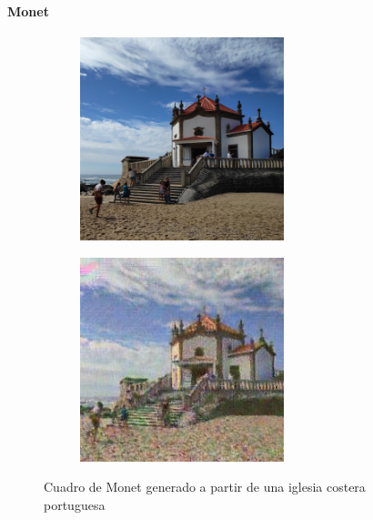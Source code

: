 \documentclass[[../main.tex]{subfiles}
\begin{document}
        \newpage
    
    \paragraph{Monet}
    
    \begin{figure}[!htb]
            \begin{subfigure}[b]{0.49\textwidth}
            \includegraphics[width=0.65\textwidth]{imagenes/imagen2cuadro/propias/monet/IMG_20190901_131403.jpg}
            \end{subfigure}
        \hfill
            \begin{subfigure}[b]{0.49\textwidth}
            \includegraphics[width=0.65\textwidth]{imagenes/imagen2cuadro/propias/monet/IMG_20190901_131403_2.jpg}
            \end{subfigure}
        \caption{Cuadro de Monet generado a partir de una iglesia costera portuguesa}
        \label{fig:monet_cuadro_iglesia_portuguesa_playa}
        \end{figure}
        
\end{document}
